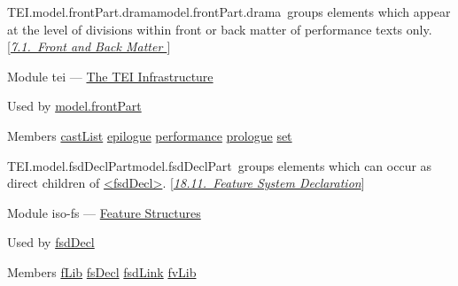\begin{reflist}
\item[]\begin{specHead}{TEI.model.frontPart.drama}{model.frontPart.drama} groups elements which appear at the level of divisions within front or back matter of performance texts only. [\textit{\hyperref[DRFAB]{7.1.\ Front and Back Matter }}]\end{specHead} 
    \item[{Module}]
  tei — \hyperref[ST]{The TEI Infrastructure}
    \item[{Used by}]
  \hyperref[TEI.model.frontPart]{model.frontPart}
    \item[{Members}]
  \hyperref[TEI.castList]{castList} \hyperref[TEI.epilogue]{epilogue} \hyperref[TEI.performance]{performance} \hyperref[TEI.prologue]{prologue} \hyperref[TEI.set]{set}
\end{reflist}  
\begin{reflist}
\item[]\begin{specHead}{TEI.model.fsdDeclPart}{model.fsdDeclPart} groups elements which can occur as direct children of \hyperref[TEI.fsdDecl]{<fsdDecl>}. [\textit{\hyperref[FD]{18.11.\ Feature System Declaration}}]\end{specHead} 
    \item[{Module}]
  iso-fs — \hyperref[FS]{Feature Structures}
    \item[{Used by}]
  \hyperref[TEI.fsdDecl]{fsdDecl}
    \item[{Members}]
  \hyperref[TEI.fLib]{fLib} \hyperref[TEI.fsDecl]{fsDecl} \hyperref[TEI.fsdLink]{fsdLink} \hyperref[TEI.fvLib]{fvLib}
\end{reflist}  
